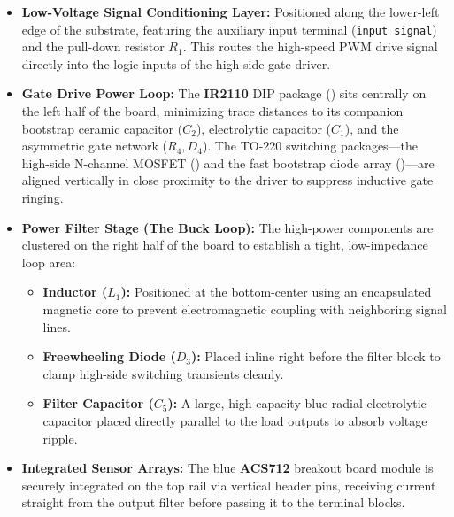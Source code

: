 \begin{itemize}
    \item \textbf{Low-Voltage Signal Conditioning Layer:} Positioned along the lower-left edge of the substrate, featuring the auxiliary input terminal (\texttt{input signal}) and the pull-down resistor $R_1$. This routes the high-speed PWM drive signal directly into the logic inputs of the high-side gate driver.
    \item \textbf{Gate Drive Power Loop:} The \textbf{IR2110} DIP package () sits centrally on the left half of the board, minimizing trace distances to its companion bootstrap ceramic capacitor ($C_2$), electrolytic capacitor ($C_1$), and the asymmetric gate network ($R_4, D_4$). The TO-220 switching packages—the high-side N-channel MOSFET () and the fast bootstrap diode array ()—are aligned vertically in close proximity to the driver to suppress inductive gate ringing.
    \item \textbf{Power Filter Stage (The Buck Loop):} The high-power components are clustered on the right half of the board to establish a tight, low-impedance loop area:
    \begin{itemize}
        \item \textbf{Inductor ($L_1$):} Positioned at the bottom-center using an encapsulated magnetic core to prevent electromagnetic coupling with neighboring signal lines.
        \item \textbf{Freewheeling Diode ($D_3$):} Placed inline right before the filter block to clamp high-side switching transients cleanly.
        \item \textbf{Filter Capacitor ($C_5$):} A large, high-capacity blue radial electrolytic capacitor placed directly parallel to the load outputs to absorb voltage ripple.
    \end{itemize}
    \item \textbf{Integrated Sensor Arrays:} The blue \textbf{ACS712} breakout board module is securely integrated on the top rail via vertical header pins, receiving current straight from the output filter before passing it to the terminal blocks. 
\end{itemize}
